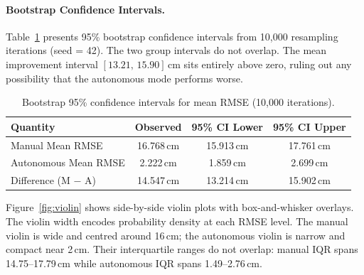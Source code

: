 \begin{table}[tbp]
  \centering
  \caption{Effect size measures for the performance difference between operating modes.}
  \label{tab:effect}
\end{table}

\paragraph{Bootstrap Confidence Intervals.}
Table~\ref{tab:bootstrap} presents 95\% bootstrap confidence intervals
from 10,000 resampling iterations (seed = 42). The two
group intervals do not overlap. The mean improvement interval
$[13.21,\,15.90]$\,cm sits entirely above zero, ruling out any
possibility that the autonomous mode performs worse.

\begin{table}[tbp]
  \centering
  \caption{Bootstrap 95\% confidence intervals for mean RMSE (10,000 iterations).}
  \label{tab:bootstrap}
  \begin{tabular}{lccc}
    \toprule
    Quantity             & Observed   & 95\% CI Lower & 95\% CI Upper \\
    \midrule
    Manual Mean RMSE     & 16.768\,cm & 15.913\,cm    & 17.761\,cm    \\
    Autonomous Mean RMSE & 2.222\,cm  & 1.859\,cm     & 2.699\,cm     \\
    Difference (M $-$ A) & 14.547\,cm & 13.214\,cm    & 15.902\,cm    \\
    \bottomrule
  \end{tabular}
\end{table}

Figure~\ref{fig:violin} shows side-by-side violin plots with
box-and-whisker overlays. The violin width encodes probability density
at each RMSE level. The manual violin is wide and centred around
16\,cm; the autonomous violin is narrow and compact near 2\,cm. Their
interquartile ranges do not overlap: manual IQR spans
14.75--17.79\,cm while autonomous IQR spans 1.49--2.76\,cm.

